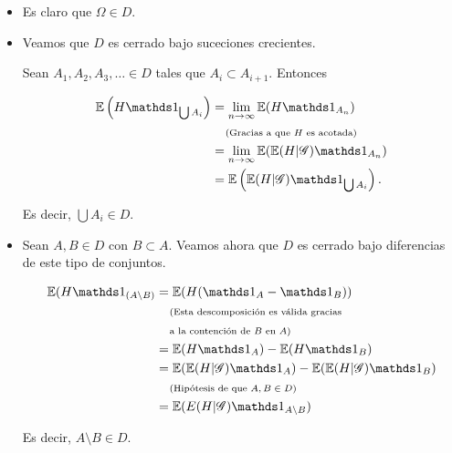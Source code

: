 \begin{itemize}
	\item 
        Es claro que $\Omega \in D$.\pn

    \item
        Veamos que $D$ es cerrado bajo suceciones crecientes.\pn

        Sean $A_1, A_2, A_3, \dots \in D$ tales que $A_i \subset A_{i+1}$. Entonces

        \begin{align}
         \E\paren{H \indic_{\bigcup A_i}}   &=  \lim_{n \rightarrow \infty}    \E(H \indic_{A_n})             \\
                                            &\comment{Gracias a que $H$ es acotada}                           \\
                                            &=  \lim_{n \rightarrow \infty}    \E(\E( H | \G) \indic_{A_n})   \\
                                            &=  \E\paren{\E( H | \G) \indic_{\bigcup A_i}}.
        \end{align}

        Es decir, $\bigcup A_i \in D$.\pn

    \item
        Sean $A, B \in D$ con $B \subset A$. Veamos ahora que $D$ es cerrado bajo diferencias de este tipo de conjuntos. 

        \begin{align}
                \E(H \indic_{(A \setminus B)}   &=  \E(H (\indic_A - \indic_B))                                                 \\
                                                &\lcomment{Esta descomposición es válida gracias}                               \\
                                                &\rcomment{a la contención de $B$ en $A$}                                      \\
                                                &=  \E(H \indic_A) - \E(H \indic_B)                                             \\
                                                &=  \E(\E(H | \G) \indic_A) - \E(\E(H | \G) \indic_B)                           \\
                                                &\comment{Hipótesis de que $A, B \in D$}                                        \\
                                                &=  \E(E(H | \G) \indic_{A \setminus B})
        \end{align}

        Es decir, $A \setminus B \in D$.\pn
\end{itemize}


